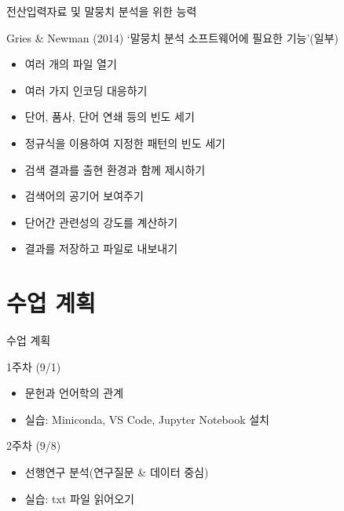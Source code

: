 \documentclass[11pt, aspectratio=169]{beamer}
\begin{document}
\begin{frame}[t]{전산입력자료 및 말뭉치 분석을 위한 능력}
  \begin{block}{Gries \& Newman (2014) ‘말뭉치 분석 소프트웨어에 필요한 기능’(일부)}
    \begin{itemize}
      \item 여러 개의 파일 열기
      \item 여러 가지 인코딩 대응하기
      \item 단어, 품사, 단어 연쇄 등의 빈도 세기
      \item 정규식을 이용하여 지정한 패턴의 빈도 세기
      \item 검색 결과를 출현 환경과 함께 제시하기
      \item 검색어의 공기어 보여주기
      \item 단어간 관련성의 강도를 계산하기
      \item 결과를 저장하고 파일로 내보내기
    \end{itemize}
  \end{block}
\end{frame}

\section{수업 계획}

\begin{frame}[t]{수업 계획}
  \begin{block}{1주차 (9/1)}
    \begin{itemize}
      \item 문헌과 언어학의 관계
      \item 실습: Miniconda, VS Code, Jupyter Notebook 설치
    \end{itemize}    
  \end{block}

  \begin{block}{2주차 (9/8)}
    \begin{itemize}
      \item 선행연구 분석(연구질문 \& 데이터 중심)
      \item 실습: txt 파일 읽어오기
    \end{itemize}    


  \end{block}

\end{frame}
\end{document}
